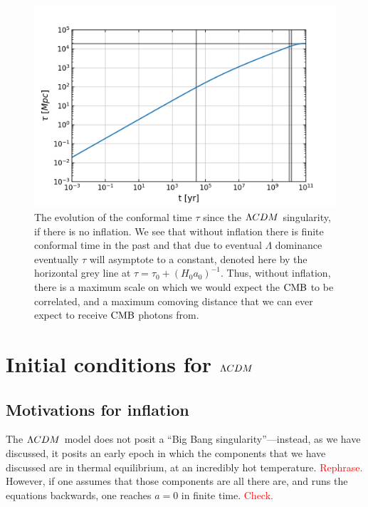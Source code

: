 \begin{figure}[!pth]
\centering     %
    \includegraphics[width=.75\columnwidth]{plots/lcdm_tau.png}
\caption{
    The evolution of the conformal time $\tau$ since the $\Lambda CDM$ singularity,
    if there is no inflation.
    We see that without inflation there is finite conformal time in the past
    and that due to eventual $\Lambda$ dominance
    eventually $\tau$ will asymptote to a constant,
    denoted here by the horizontal grey line at $\tau=\tau_0+(H_0a_0)^{-1}$.
    Thus, without inflation, there is a maximum scale on which we would expect the
    $\text{CMB}$ to be correlated, and a maximum comoving distance that we can ever
    expect to receive $\text{CMB}$ photons from.
}\label{fig:lcdm_tau}
\end{figure}


\section{Initial conditions for $\Lambda CDM$}
    \subsection{Motivations for inflation}
    The $\Lambda CDM$ model does not posit a ``Big Bang singularity''---instead, as we have discussed, it
    posits an early epoch in which the components that we have discussed are in thermal equilibrium,
    at an incredibly hot temperature. \textcolor{red}{Rephrase.}
    However, if one assumes that those components are all there are, and runs the equations backwards,
    one reaches $a=0$ in finite time.
    \textcolor{red}{Check.}

